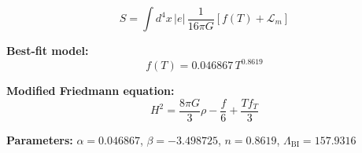 
\begin{equation}
  S = \int d^4x \, |e| \, \frac{1}{16\pi G} \left[ f(T) + \mathcal{L}_m \right]
\end{equation}

\textbf{Best-fit model:}
\begin{equation}
  f(T) = 0.046867 \, T^{0.8619}
\end{equation}

\textbf{Modified Friedmann equation:}
\begin{equation}
  H^2 = \frac{8\pi G}{3} \rho - \frac{f}{6} + \frac{T f_T}{3}
\end{equation}

\textbf{Parameters:}
$\alpha = 0.046867$, \quad
$\beta = -3.498725$, \quad
$n = 0.8619$, \quad
$\Lambda_{\text{BI}} = 157.9316$